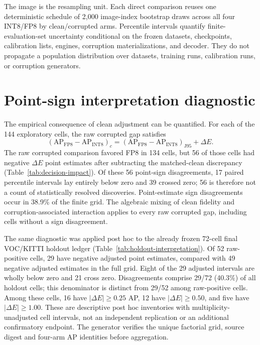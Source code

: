 \documentclass[10pt]{article}
\newcommand{\AP}{\mathrm{AP}}
\newcommand{\Jclean}{\mathrm{J95}}
\newcommand{\DeltaE}{\Delta E}
\begin{document}
The image is the resampling unit. Each direct comparison reuses one deterministic
schedule of 2,000 image-index bootstrap draws across all four INT8/FP8 by
clean/corrupted arms. Percentile intervals quantify finite-evaluation-set
uncertainty conditional on the frozen datasets, checkpoints, calibration lists,
engines, corruption materializations, and decoder. They do not propagate a
population distribution over datasets, training runs, calibration runs, or
corruption generators.

\section{Point-sign interpretation diagnostic}

The empirical consequence of clean adjustment can be quantified. For each
of the 144 exploratory cells, the raw corrupted gap satisfies
\begin{equation}
(\AP_{\mathrm{FP8}}-\AP_{\mathrm{INT8}})_{c}
=(\AP_{\mathrm{FP8}}-\AP_{\mathrm{INT8}})_{\Jclean}+\DeltaE.
\end{equation}
The raw corrupted comparison favored FP8 in 134 cells, but 56 of those cells
had negative $\DeltaE$ point estimates after subtracting the matched-clean
discrepancy (Table~\ref{tab:decision-impact}). Of these 56 point-sign
disagreements, 17 paired percentile intervals lay entirely below zero and 39 crossed
zero; 56 is therefore not a count of statistically resolved discoveries.
Point-estimate sign disagreements occur in 38.9\% of the finite grid. The algebraic
mixing of clean fidelity and corruption-associated interaction applies to
every raw corrupted gap, including cells without a sign disagreement.

\begin{table}[htbp]
\centering
\caption{Point-sign inventory over the 144 exploratory cells. ``Below AP''
counts a cell when at least one quantized treatment falls below the descriptive cutoff.}
\label{tab:decision-impact}
\small

\end{table}

The same diagnostic was applied post hoc to the already frozen 72-cell final
VOC/KITTI holdout ledger (Table~\ref{tab:holdout-interpretation}). Of 52 raw-positive
cells, 29 have negative adjusted point estimates, compared with 49 negative
adjusted estimates in the full grid. Eight of the 29 adjusted intervals are
wholly below zero and 21 cross zero. Disagreements comprise 29/72 (40.3\%) of all
holdout cells; this denominator is distinct from 29/52 among raw-positive cells.
Among these cells, 16 have $|\Delta E|\geq0.25$ AP, 12 have $|\Delta E|\geq0.50$,
and five have $|\Delta E|\geq1.00$. These are descriptive post hoc inventories
with multiplicity-unadjusted cell intervals, not an independent replication or
an additional confirmatory endpoint. The generator verifies the unique
factorial grid, source digest and four-arm AP identities before aggregation.
\end{document}
